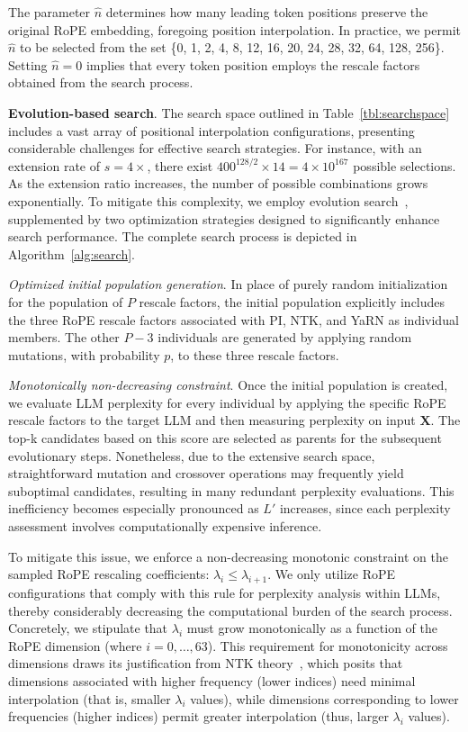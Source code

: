 The parameter $\hat{n}$ determines how many leading token positions preserve the original RoPE embedding, foregoing position interpolation. In practice, we permit $\hat{n}$ to be selected from the set \{0, 1, 2, 4, 8, 12, 16, 20, 24, 28, 32, 64, 128, 256\}. Setting $\hat{n}=0$ implies that every token position employs the rescale factors obtained from the search process.

\textbf{Evolution-based search}. The search space outlined in Table~\ref{tbl:searchspace} includes a vast array of positional interpolation configurations, presenting considerable challenges for effective search strategies. For instance, with an extension rate of $s=4\times$, there exist $400^{128/2}\times14 = 4\times10^{167}$ possible selections. As the extension ratio increases, the number of possible combinations grows exponentially. To mitigate this complexity, we employ evolution search~\cite{guo2020single}, supplemented by two optimization strategies designed to significantly enhance search performance. The complete search process is depicted in Algorithm~\ref{alg:search}.

\textit{Optimized initial population generation}. In place of purely random initialization for the population of $P$ rescale factors, the initial population explicitly includes the three RoPE rescale factors associated with PI, NTK, and YaRN as individual members. The other $P-3$ individuals are generated by applying random mutations, with probability $p$, to these three rescale factors.

\textit{Monotonically non-decreasing constraint}. Once the initial population is created, we evaluate LLM perplexity for every individual by applying the specific RoPE rescale factors to the target LLM and then measuring perplexity on input $\mathbf{X}$. The top-k candidates based on this score are selected as parents for the subsequent evolutionary steps. Nonetheless, due to the extensive search space, straightforward mutation and crossover operations may frequently yield suboptimal candidates, resulting in many redundant perplexity evaluations. This inefficiency becomes especially pronounced as $L'$ increases, since each perplexity assessment involves computationally expensive inference.

To mitigate this issue, we enforce a non-decreasing monotonic constraint on the sampled RoPE rescaling coefficients: $\lambda_i\le \lambda_{i+1}$. We only utilize RoPE configurations that comply with this rule for perplexity analysis within LLMs, thereby considerably decreasing the computational burden of the search process. Concretely, we stipulate that $\lambda_i$ must grow monotonically as a function of the RoPE dimension (where $i=0,\ldots,63$). This requirement for monotonicity across dimensions draws its justification from NTK theory~\cite{jacot2018neural,tancik2020fourier,ntk}, which posits that dimensions associated with higher frequency (lower indices) need minimal interpolation (that is, smaller $\lambda_i$ values), while dimensions corresponding to lower frequencies (higher indices) permit greater interpolation (thus, larger $\lambda_i$ values).

